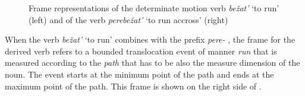 \begin{figure}\small
{}
\hfill
{}
\caption{Frame representations of the determinate motion verb \textit{be\v{z}at'} `to run' (left) and of the verb \textit{perebe\v{z}at'} `to run accross' (right) \label{frame:bezhat}}
\end{figure}

When the verb \textit{be\v{z}at'} `to run' combines with the prefix \textit{pere-}  , the frame for the derived verb refers to a bounded translocation  event of manner \textit{run} that is measured according to the \textit{path} that has to be also the measure dimension of the noun. The event starts at the minimum point of the path and ends at the maximum point of the path. This frame is shown on the right side of .

